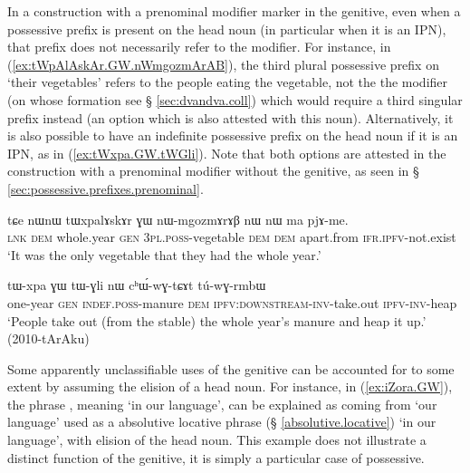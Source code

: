 In a construction with a prenominal modifier marker in the genitive, even when a possessive prefix is present on the head noun (in particular when it is an IPN), that prefix does not necessarily refer to the modifier. For instance, in (\ref{ex:tWpAlAskAr.GW.nWmgozmArAB}), the third plural possessive prefix  on  `their vegetables' refers to the people eating the vegetable, not the the modifier  (on whose formation see § \ref{sec:dvandva.coll}) which would require a third singular prefix instead (an option which is also attested with this noun). Alternatively, it is also possible to have an indefinite possessive prefix on the head noun if it is an IPN, as in (\ref{ex:tWxpa.GW.tWGli}). Note that both options are attested in the construction with a prenominal modifier without the genitive, as seen in § \ref{sec:possessive.prefixes.prenominal}.
 
 \begin{exe}
\ex \label{ex:tWpAlAskAr.GW.nWmgozmArAB}
\gll  tɕe nɯnɯ tɯxpalɤskɤr ɣɯ nɯ-mgozmɤrɤβ nɯ nɯ ma pjɤ-me.  \\
\textsc{lnk} \textsc{dem} whole.year \textsc{gen} \textsc{3pl}.\textsc{poss}-vegetable \textsc{dem} \textsc{dem} apart.from \textsc{ifr}.\textsc{ipfv}-not.exist \\
\glt `It was the only vegetable that they had the whole year.' 
\end{exe}

\begin{exe}
\ex \label{ex:tWxpa.GW.tWGli}
\gll  tɯ-xpa ɣɯ tɯ-ɣli nɯ cʰɯ́-wɣ-tɕɤt tú-wɣ-rmbɯ  \\
one-year \textsc{gen} \textsc{indef}.\textsc{poss}-manure \textsc{dem} \textsc{ipfv}:\textsc{downstream}-\textsc{inv}-take.out \textsc{ipfv}-\textsc{inv}-heap \\
\glt `People take out (from the stable) the whole year's manure and heap it up.' (2010-tArAku)
\end{exe}

Some apparently unclassifiable uses of the genitive can be accounted for to some extent by assuming the elision of a head noun.  For instance, in (\ref{ex:iZora.GW}), the phrase , meaning `in our language', can be explained as coming from  `our language' used as a absolutive locative phrase (§ \ref{absolutive.locative}) `in our language', with elision of the head noun. This example does not illustrate a distinct function of the genitive, it is simply a particular case of possessive.

